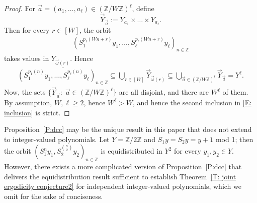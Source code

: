 \documentclass[11pt]{amsart}
\theoremstyle{definition}
\newcommand{\Z}{{\mathbb Z}}
\newcommand{\1}{{\mathbf{1}}}
\begin{document}
\begin{proof}
   
    For $\vec{a}=(a_{1},\dots,a_{\ell})\in (\Z/W\Z)^{\ell}$, define $$\vec{Y}_{\vec{a}}:=Y_{a_{1}}\times\dots \times Y_{a_{\ell}}.$$ Then for every $r\in [W]$, the orbit 
    \begin{align*}
        (S_1^{p_1(Wn+r)}y_{1}, \ldots, S_\ell^{p_\ell(Wn+r)}y_{\ell})_{n\in\Z}
    \end{align*}
    takes values in $Y_{\vec{\omega}(r)}$.
Hence
    \begin{align}\label{E: inclusion}
        \overline{(S_1^{p_1(n)}y_{1}, \ldots, S_\ell^{p_\ell(n)}y_{\ell})_{n\in\Z}}\subseteq\bigcup\limits_{r\in [W]}\vec{Y}_{\vec{\omega}(r)} \subseteq \bigcup\limits_{\vec{a}\in (\Z/W\Z)^{\ell}}\vec{Y}_{\vec{a}}=Y^\ell.
    \end{align}
    Now, the sets $\{\vec{Y}_{\vec{a}}\colon\; \vec{a}\in (\Z/W\Z)^{\ell}\}$ are all disjoint, and there are $W^\ell$ of them. By assumption, $W, \ell\geq 2$, hence $W^\ell>W$, and hence the second inclusion in \eqref{E: inclusion} is strict. 
    \end{proof}

       Proposition~\ref{P:dcc} may be the unique result in this paper that does not extend to integer-valued polynomials. Let $Y=\Z/2\Z$ and $S_1 y = S_2 y = y + 1$ mod 1; then the orbit $(S_1^n y_1, S_2^{\binom{n}{2}}y_2)_{n\in\Z}$ is equidistributed in $Y^2$ for every $y_1,y_2\in Y$.
       However, there exists a more complicated version of Proposition~\ref{P:dcc} that delivers the equidistribution result sufficient to establish Theorem~\ref{T: joint ergodicity conjecture2} for independent integer-valued polynomials, which we omit for the sake of conciseness. 
\end{document}
